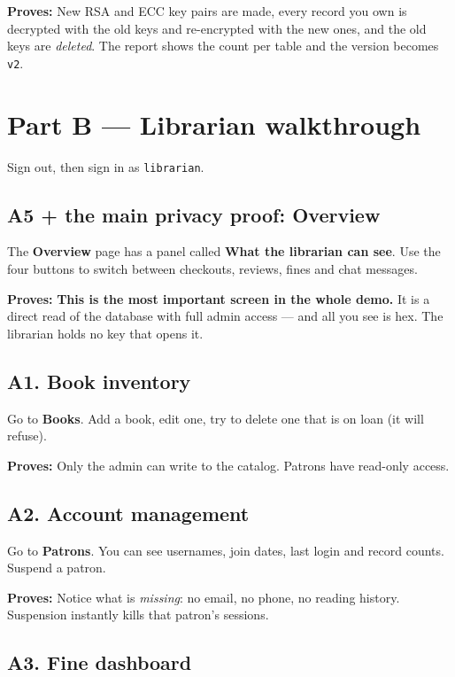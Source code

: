 \documentclass[11pt]{article}
\newcommand{\proof}[1]{\textcolor{ok}{\textbf{Proves:}} #1}
\begin{document}
\proof{New RSA and ECC key pairs are made, every record you own is decrypted
with the old keys and re-encrypted with the new ones, and the old keys are
\emph{deleted}. The report shows the count per table and the version becomes
\texttt{v2}.}

\newpage
\section{Part B --- Librarian walkthrough}

Sign out, then sign in as \texttt{librarian}.

\subsection*{A5 + the main privacy proof: Overview}

The \textbf{Overview} page has a panel called \textbf{What the librarian can
see}. Use the four buttons to switch between checkouts, reviews, fines and
chat messages.

\proof{\textbf{This is the most important screen in the whole demo.} It is a
direct read of the database with full admin access --- and all you see is
hex. The librarian holds no key that opens it.}

\subsection*{A1. Book inventory}

Go to \textbf{Books}. Add a book, edit one, try to delete one that is on loan
(it will refuse).

\proof{Only the admin can write to the catalog. Patrons have read-only access.}

\subsection*{A2. Account management}

Go to \textbf{Patrons}. You can see usernames, join dates, last login and
record counts. Suspend a patron.

\proof{Notice what is \emph{missing}: no email, no phone, no reading history.
Suspension instantly kills that patron's sessions.}

\subsection*{A3. Fine dashboard}
\end{document}
